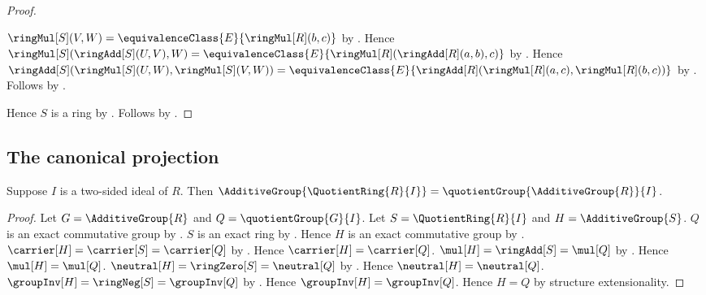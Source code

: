 \begin{proof}
\begin{subproof}
            $\ringMul[S](V,W)=\equivalenceClass{E}{\ringMul[R](b,c)}$ by
            .
        Hence
            $\ringMul[S](\ringAdd[S](U,V),W)
                =\equivalenceClass{E}{
                    \ringMul[R](\ringAdd[R](a,b),c)}$ by
            .
        Hence
            $\ringAdd[S](\ringMul[S](U,W),\ringMul[S](V,W))
                =\equivalenceClass{E}{
                    \ringAdd[R](\ringMul[R](a,c),\ringMul[R](b,c))}$ by
            .
        Follows by .
    \end{subproof}
    Hence $S$ is a ring by
        .
    Follows by .
\end{proof}

\subsection{The canonical projection}

\begin{theorem}\label{quotient_ring_additive_group}
    Suppose $I$ is a two-sided ideal of $R$.
    Then
        $\AdditiveGroup{\QuotientRing{R}{I}}
            =\quotientGroup{\AdditiveGroup{R}}{I}$.
\end{theorem}
\begin{proof}
    Let $G=\AdditiveGroup{R}$ and $Q=\quotientGroup{G}{I}$.
    Let $S=\QuotientRing{R}{I}$ and $H=\AdditiveGroup{S}$.
    $Q$ is an exact commutative group by
        .
    $S$ is an exact ring by .
    Hence $H$ is an exact commutative group by
        .
    $\carrier[H]=\carrier[S]=\carrier[Q]$ by
        .
    Hence $\carrier[H]=\carrier[Q]$.
    $\mul[H]=\ringAdd[S]=\mul[Q]$ by
        .
    Hence $\mul[H]=\mul[Q]$.
    $\neutral[H]=\ringZero[S]=\neutral[Q]$ by
        .
    Hence $\neutral[H]=\neutral[Q]$.
    $\groupInv[H]=\ringNeg[S]=\groupInv[Q]$ by
        .
    Hence $\groupInv[H]=\groupInv[Q]$.
    Hence $H=Q$ by structure extensionality.
\end{proof}

